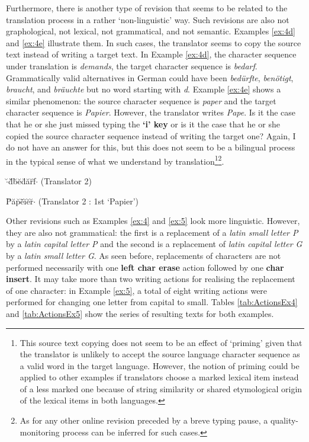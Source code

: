 Furthermore, there is another type of revision that seems to be related to the translation process in a rather `non-linguistic' way. Such revisions are also not graphological, not lexical, not grammatical, and not semantic. Examples \ref{ex:4d} and \ref{ex:4e} illustrate them. In such cases, the translator seems to copy the source text instead of writing a target text. In Example \ref{ex:4d}, the character sequence under translation is \emph{demands}, the target character sequence is \emph{bedarf}. Grammatically valid alternatives in German could have been \emph{bedürfte}, \emph{benötigt}, \emph{braucht}, and \emph{bräuchte} but no word starting with \emph{d}. Example \ref{ex:4e} shows a similar phenomenon: the source character sequence is \emph{paper} and the target character sequence is \emph{Papier}. However, the translator writes \emph{Pape}. Is it the case that he or she just missed typing the \textbf{`i' key} or is it the case that he or she copied the source character sequence instead of writing the target one? Again, I do not have an answer for this, but this does not seem to be a bilingual process in the typical sense of what we understand by translation\footnote{This source text copying does not seem to be an effect of `priming' given that the translator is unlikely to accept the source language character sequence as a valid word in the target language. However, the notion of priming could be applied to other examples if translators choose a marked lexical item instead of a less marked one because of string similarity or shared etymological origin of the lexical items in both languages.}\footnote{As for any other online revision preceded by a breve typing pause, a quality-monitoring process can be inferred for such cases.}.

\begin{exe} 
  \ex\label{ex:4d}$\cdot$\u{ }d\u{ }\uettl\u{ }b\u{ }e\u{ }d\u{ }a\u{ }r\u{ }f\={ }$\cdot$  (Translator 2)
\end{exe}

\begin{exe} 
  \ex\label{ex:4e}P\u{ }a\u{ }p\u{ }e\u{ }\uettl\={ }i\u{ }e\u{ }r\u{ }$\cdot$ (Translator 2 : 1st `Papier')
\end{exe}


Other revisions such as Examples \ref{ex:4} and \ref{ex:5} look more linguistic. However, they are also not grammatical: the first is a replacement of a \emph{latin small letter P} by a \emph{latin capital letter P} and the second is a replacement of \emph{latin capital letter G} by a \emph{latin small letter G}. As seen before, replacements of characters are not performed necessarily with one \textbf{left char erase} action followed by one \textbf{char insert}. It may take more than two writing actions for realising the replacement of one character: in Example \ref{ex:5}, a total of eight writing actions were performed for changing one letter from capital to small. Tables \ref{tab:ActionsEx4} and \ref{tab:ActionsEx5} show the series of resulting texts for both examples.

